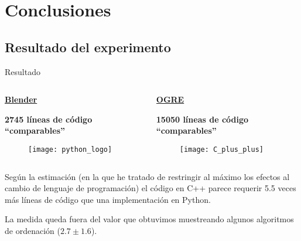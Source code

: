 \section{Conclusiones} 

\subsection{Resultado del experimento}
\begin{frame}{Resultado}
\begin{columns}
  \begin{column}{0.5\textwidth}
    \textbf{\underline{Blender}}
    
    \textbf{2745 líneas de código ``comparables''}

	\begin{figure}
		\texttt{[image: python\_logo]} 
	\end{figure}
  \end{column}

  \begin{column}{0.5\textwidth}
    \textbf{\underline{OGRE}}
    
    \textbf{15050 líneas de código ``comparables''}

	\begin{figure}
		\texttt{[image: C\_plus\_plus]} 
	\end{figure}
  \end{column}
\end{columns}

\vspace{0.5cm}
Según la estimación (en la que he tratado de restringir al máximo los
efectos al cambio de lenguaje de programación) el código en C++ parece
requerir 5.5 veces más líneas de código que una implementación en Python.

\vspace{0.5cm}
La medida queda fuera del valor que obtuvimos muestreando
algunos algoritmos de ordenación ($2.7 \pm 1.6$).

\end{frame}

